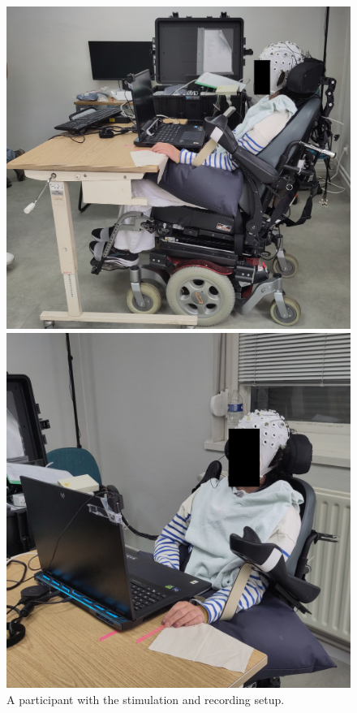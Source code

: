 \begin{figure}
  \begin{minipage}{.45\textwidth}
    \includegraphics[width=\textwidth]{figures/patients/PD01a-obfuscated.jpg}
  \end{minipage}\hfill%
  \begin{minipage}{.45\textwidth}
    \includegraphics[width=\textwidth]{figures/patients/PD01b-obfuscated.jpg}
  \end{minipage}
  \caption{A participant with the stimulation and recording setup.}
\end{figure}

